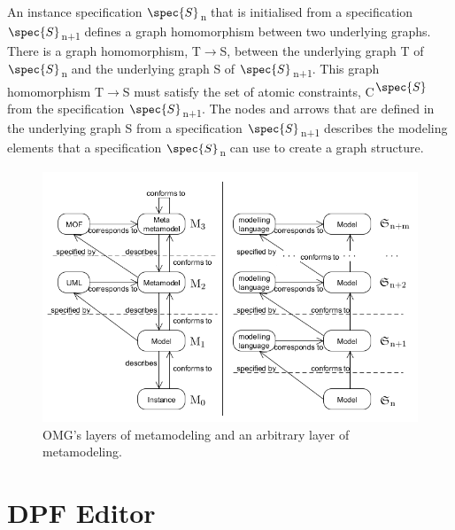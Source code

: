 An instance specification $\spec{S}$\textsubscript{n} that is initialised from
a specification $\spec{S}$\textsubscript{n+1} defines a graph homomorphism
between two underlying graphs. There is a graph homomorphism,
T$\longrightarrow$S, between the underlying graph T of
$\spec{S}$\textsubscript{n} and the underlying graph S of
$\spec{S}$\textsubscript{n+1}\cite{Lamo2013}. This graph homomorphism
T$\longrightarrow$S must satisfy the set of atomic constraints,
C\textsuperscript{$\spec{S}$} from the specification
$\spec{S}$\textsubscript{n+1}. The nodes and arrows that are defined in the
underlying graph S from a specification $\spec{S}$\textsubscript{n+1} describes
the modeling elements that a specification $\spec{S}$\textsubscript{n} can use
to create a graph structure.

\cite{Brambilla:MDSE}

\begin{figure}[H]
	\centering
	\includegraphics[scale=0.7]{./Figures/MOF_vs_DPF}
	\caption[OMG's layers of metamodeling and multilayer modeling]
	{OMG's layers of metamodeling and an arbitrary layer of metamodeling.}
	\label{fig:MOF_vs_DPF}
\end{figure}



 
\section{DPF Editor}

